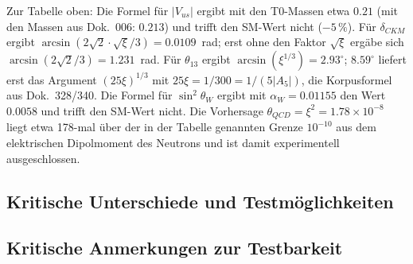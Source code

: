 	Zur Tabelle oben: Die Formel für $|V_{us}|$ ergibt mit den T0-Massen etwa $0.21$ (mit den Massen aus Dok.~006: $0.213$) und trifft den SM-Wert nicht ($-5\,\%$). Für $\delta_{CKM}$ ergibt $\arcsin(2\sqrt2\cdot\sqrt{\xi}/3) = 0.0109$~rad; erst ohne den Faktor $\sqrt{\xi}$ ergäbe sich $\arcsin(2\sqrt2/3) = 1.231$~rad. Für $\theta_{13}$ ergibt $\arcsin(\xi^{1/3}) = 2.93^\circ$; $8.59^\circ$ liefert erst das Argument $(25\xi)^{1/3}$ mit $25\xi = 1/300 = 1/(5|A_5|)$, die Korpusformel aus Dok.~328/340. Die Formel für $\sin^2\theta_W$ ergibt mit $\alpha_W = 0.01155$ den Wert $0.0058$ und trifft den SM-Wert nicht. Die Vorhersage $\theta_{QCD} = \xi^2 = 1.78 \times 10^{-8}$ liegt etwa 178-mal über der in der Tabelle genannten Grenze $10^{-10}$ aus dem elektrischen Dipolmoment des Neutrons und ist damit experimentell ausgeschlossen.
\subsection{Kritische Unterschiede und Testmöglichkeiten}
\label{subsec:critical_differences}

\begin{table}[h]
	\centering
	\caption{Unterschiede zwischen $\Lambda$CDM und T0 (T0-Spalte spekulativ, vgl.\ P39)}
\end{table}

\subsection{Kritische Anmerkungen zur Testbarkeit}
\label{subsec:testability_notes}

